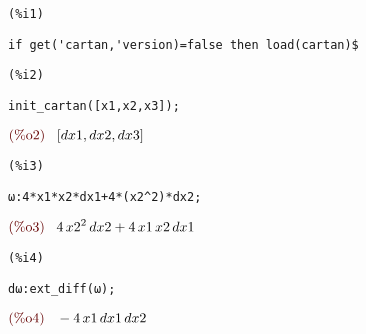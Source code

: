 \noindent
\begin{minipage}[t]{8ex}
\color{red}\bf
\begin{verbatim}
(%i1) 
\end{verbatim}
\end{minipage}
\begin{minipage}[t]{\textwidth}
\color{blue}
\begin{verbatim}
if get('cartan,'version)=false then load(cartan)$
\end{verbatim}
\end{minipage}

\smallskip

\noindent
\begin{minipage}[t]{8ex}
\color{red}\bf
\begin{verbatim}
(%i2) 
\end{verbatim}
\end{minipage}
\begin{minipage}[t]{\textwidth}
\color{blue}
\begin{verbatim}
init_cartan([x1,x2,x3]);
\end{verbatim}
\end{minipage}
\begin{math}\displaystyle
\parbox{8ex}{\color{labelcolor}(\%o2) }
[dx1,dx2,dx3]
\end{math}


\noindent
\begin{minipage}[t]{8ex}
\color{red}\bf
\begin{verbatim}
(%i3) 
\end{verbatim}
\end{minipage}
\begin{minipage}[t]{\textwidth}
\color{blue}
\begin{verbatim}
ω:4*x1*x2*dx1+4*(x2^2)*dx2;
\end{verbatim}
\end{minipage}
\begin{math}\displaystyle
\parbox{8ex}{\color{labelcolor}(\%o3) }
4\,{x2}^{2}\,dx2+4\,x1\,x2\,dx1
\end{math}


\noindent
\begin{minipage}[t]{8ex}
\color{red}\bf
\begin{verbatim}
(%i4) 
\end{verbatim}

\end{minipage}
\begin{minipage}[t]{\textwidth}
\color{blue}
\begin{verbatim}
dω:ext_diff(ω);
\end{verbatim}
\end{minipage}
\begin{math}\displaystyle
\parbox{8ex}{\color{labelcolor}(\%o4) }
-4\,x1\,dx1\,dx2
\end{math}


